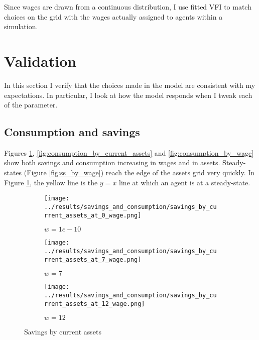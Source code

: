 \documentclass[12pt]{article}
\begin{document}
\vspace{5mm}
Since wages are drawn from a continuous distribution, I use fitted VFI to match choices on the grid with the wages actually assigned to agents within a simulation.

\newpage

\section{Validation}

In this section I verify that the choices made in the model are consistent with my expectations. In particular, I look at how the model responds when I tweak each of the parameter.

\subsection{Consumption and savings}

Figures \ref{fig:savings_by_assets}, \ref{fig:consumption_by_current_assets} and \ref{fig:consumption_by_wage} show both savings and consumption increasing in wages and in assets. Steady-states (Figure \ref{fig:ss_by_wage}) reach the edge of the assets grid very quickly. In Figure \ref{fig:savings_by_assets}, the yellow line is the $y=x$ line at which an agent is at a steady-state.

\begin{figure}[hbt!]

\begin{subfigure}{0.33\textwidth}
\texttt{[image: ../results/savings\_and\_consumption/savings\_by\_current\_assets\_at\_0\_wage.png]} \caption{$w=1e-10$}
\end{subfigure}%
\begin{subfigure}{0.33\textwidth}
\texttt{[image: ../results/savings\_and\_consumption/savings\_by\_current\_assets\_at\_7\_wage.png]}
\caption{$w=7$}
\end{subfigure}%
\begin{subfigure}{0.33\textwidth}
\texttt{[image: ../results/savings\_and\_consumption/savings\_by\_current\_assets\_at\_12\_wage.png]}
\caption{$w=12$}
\end{subfigure}

\caption{Savings by current assets}
\label{fig:savings_by_assets}
\end{figure}
\end{document}

